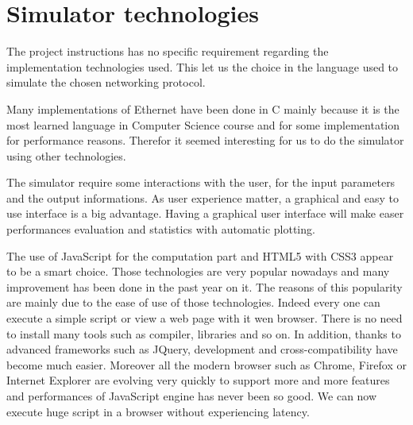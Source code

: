 \section{Simulator technologies}

The project instructions has no specific requirement regarding the
implementation technologies used. This let us the choice in the language
used to simulate the chosen networking protocol.

Many implementations of Ethernet have been done in C mainly because it
is the most learned language in Computer Science course and for some
implementation for performance reasons. Therefor it seemed interesting
for us to do the simulator using other technologies.

The simulator require some interactions with the user, for the input
parameters and the output informations. As user experience matter, a
graphical and easy to use interface is a big advantage. Having a
graphical user interface will make easer performances evaluation and
statistics with automatic plotting.

The use of JavaScript for the computation part and HTML5 with CSS3
appear to be a smart choice. Those technologies are very popular nowadays
and many improvement has been done in the past year on it. The reasons
of this popularity are mainly due to the ease of use of those
technologies. Indeed every one can execute a simple script or view a web
page with it wen browser. There is no need to install many tools such as
compiler, libraries and so on. In addition, thanks to advanced
frameworks such as JQuery, development and cross-compatibility have
become much easier.
Moreover all the modern browser such as Chrome, Firefox or Internet
Explorer are evolving very quickly to support more and more features and
performances of JavaScript engine has never been so good. We
can now execute huge script in a browser without experiencing latency.

